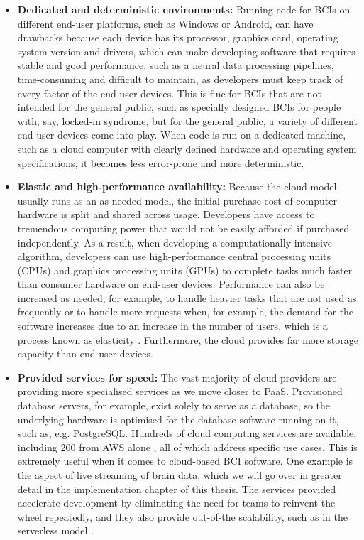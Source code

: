 \begin{itemize}
  \item \textbf{Dedicated and deterministic environments:} Running code for BCIs on different end-user platforms, such as Windows or Android, can have drawbacks because each device has its processor, graphics card, operating system version and drivers, which can make developing software that requires stable and good performance, such as a neural data processing pipelines, time-consuming and difficult to maintain, as developers must keep track of every factor of the end-user devices. This is fine for BCIs that are not intended for the general public, such as specially designed BCIs for people with, say, locked-in syndrome, but for the general public, a variety of different end-user devices come into play. When code is run on a dedicated machine, such as a cloud computer with clearly defined hardware and operating system specifications, it becomes less error-prone and more deterministic.
  \item \textbf{Elastic and high-performance availability:} Because the cloud model usually runs as an as-needed model, the initial purchase cost of computer hardware is split and shared across usage. Developers have access to tremendous computing power that would not be easily afforded if purchased independently. As a result, when developing a computationally intensive algorithm, developers can use high-performance central processing units (CPUs) and graphics processing units (GPUs) to complete tasks much faster than consumer hardware on end-user devices. Performance can also be increased as needed, for example, to handle heavier tasks that are not used as frequently or to handle more requests when, for example, the demand for the software increases due to an increase in the number of users, which is a process known as elasticity \citep{gartner_definition_nodate}. Furthermore, the cloud provides far more storage capacity than end-user devices.

  \item \textbf{Provided services for speed:} The vast majority of cloud providers are providing more specialised services as we move closer to PaaS. Provisioned database servers, for example, exist solely to serve as a database, so the underlying hardware is optimised for the database software running on it, such as, e.g. PostgreSQL. Hundreds of cloud computing services are available, including 200 from AWS alone \citep{amazon_web_services_inc_what_nodate}, all of which address specific use cases. This is extremely useful when it comes to cloud-based BCI software. One example is the aspect of live streaming of brain data, which we will go over in greater detail in the implementation chapter of this thesis. The services provided accelerate development by eliminating the need for teams to reinvent the wheel repeatedly, and they also provide out-of-the scalability, such as in the serverless model \citep{redhat_what_2022}.
\end{itemize}


